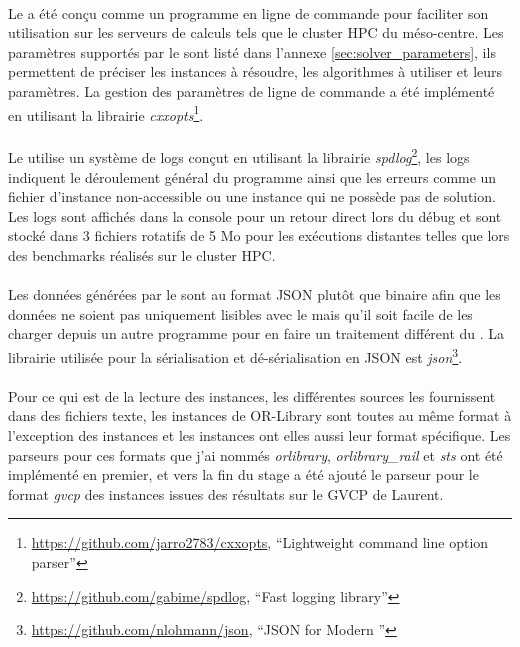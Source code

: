 \documentclass[a4paper,11pt,twoside,french,report]{../common/simplem}
\begin{document}
				\paragraph*{}
					Le \solver{} a été conçu comme un programme en ligne de commande pour faciliter son utilisation sur les serveurs de calculs tels que le cluster \gls{HPC} du méso-centre. Les paramètres supportés par le \solver{} sont listé dans l'annexe \ref{sec:solver_parameters}, ils permettent de préciser les instances à résoudre, les algorithmes à utiliser et leurs paramètres. La gestion des paramètres de ligne de commande a été implémenté en utilisant la librairie \textit{cxxopts}\footnote{\url{https://github.com/jarro2783/cxxopts}, ``Lightweight \Cpp{} command line option parser''}.
				\paragraph*{}
					Le \solver{} utilise un système de logs conçut en utilisant la librairie \textit{spdlog}\footnote{\url{https://github.com/gabime/spdlog}, ``Fast \Cpp{} logging library''}, les logs indiquent le déroulement général du programme ainsi que les erreurs comme un fichier d'instance non-accessible ou une instance qui ne possède pas de solution. Les logs sont affichés dans la console pour un retour direct lors du débug et sont stocké dans 3 fichiers rotatifs de 5 Mo pour les exécutions distantes telles que lors des benchmarks réalisés sur le cluster \gls{HPC}.
				\paragraph*{}
					Les données générées par le \solver{} sont au format JSON plutôt que binaire afin que les données ne soient pas uniquement lisibles avec le \printer{} mais qu'il soit facile de les charger depuis un autre programme pour en faire un traitement différent du \printer{}. La librairie utilisée pour la sérialisation et dé-sérialisation en JSON est \textit{json}\footnote{\url{https://github.com/nlohmann/json}, ``JSON for Modern \Cpp{}''}.
				\paragraph*{}
					Pour ce qui est de la lecture des instances, les différentes sources les fournissent dans des fichiers texte, les instances de OR-Library sont toutes au même format à l'exception des instances  et les instances  ont elles aussi leur format spécifique. Les parseurs pour ces formats que j'ai nommés \textit{orlibrary}, \textit{orlibrary\_rail} et \textit{sts} ont été implémenté en premier, et vers la fin du stage a été ajouté le parseur pour le format \textit{gvcp} des instances issues des résultats sur le \gls{GVCP} de Laurent.
\end{document}
